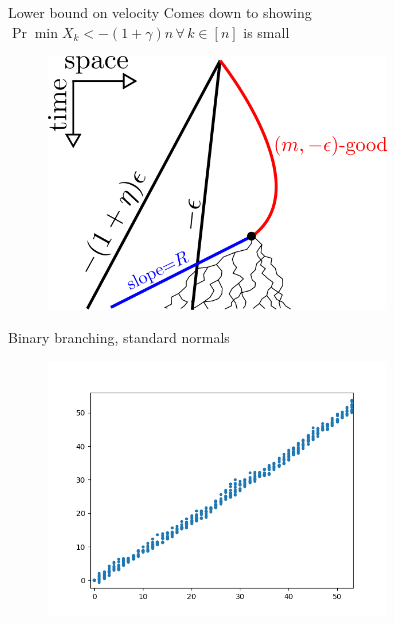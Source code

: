 \documentclass{beamer}
\begin{document}
\begin{frame}{Lower bound on velocity}
Comes down to showing $\Pr{\min X_k < -(1+\gamma)n\,\forall\,k \in [n]}$ is small
\begin{figure}
\includegraphics[width=0.8\textwidth]{graphics/lower_bound_proof.png}
\end{figure}
\end{frame}

\begin{frame}{Binary branching, standard normals}
\begin{figure}
\includegraphics[width=0.8\textwidth]{graphics/std_normal.png}
\end{figure}
\end{frame}
\end{document}
